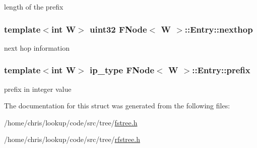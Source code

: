 length of the prefix 

\hypertarget{structFNode_1_1Entry_ae3e9eecef3c2171c60c8344d060ab491}{
\subsubsection[{nexthop}]{\setlength{\rightskip}{0pt plus 5cm}template$<$int W$>$ {\bf uint32} {\bf F\-Node}$<$ {\bf W} $>$\-::Entry\-::nexthop}}\label{structFNode_1_1Entry_ae3e9eecef3c2171c60c8344d060ab491}


next hop information 

\hypertarget{structFNode_1_1Entry_a97738115c95a2dd37ab9857bd6764e6d}{
\subsubsection[{prefix}]{\setlength{\rightskip}{0pt plus 5cm}template$<$int W$>$ {\bf ip\-\_\-type} {\bf F\-Node}$<$ {\bf W} $>$\-::Entry\-::prefix}}\label{structFNode_1_1Entry_a97738115c95a2dd37ab9857bd6764e6d}


prefix in integer value 



The documentation for this struct was generated from the following files\-:\begin{DoxyCompactItemize}
\item 
/home/chris/lookup/code/src/tree/\hyperlink{fstree_8h}{fstree.\-h}\item 
/home/chris/lookup/code/src/tree/\hyperlink{rfstree_8h}{rfstree.\-h}\end{DoxyCompactItemize}
